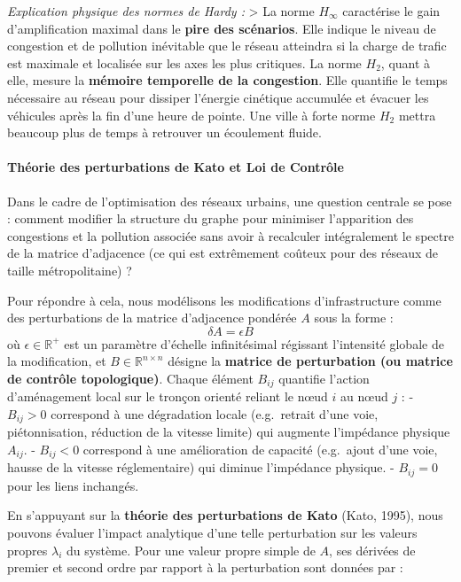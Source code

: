 \documentclass[10pt, a4paper]{article}
\begin{document}
\emph{Explication physique des normes de Hardy :} \textgreater{} La
norme \(H_\infty\) caractérise le gain d'amplification maximal dans le
\textbf{pire des scénarios}. Elle indique le niveau de congestion et de
pollution inévitable que le réseau atteindra si la charge de trafic est
maximale et localisée sur les axes les plus critiques. La norme \(H_2\),
quant à elle, mesure la \textbf{mémoire temporelle de la congestion}.
Elle quantifie le temps nécessaire au réseau pour dissiper l'énergie
cinétique accumulée et évacuer les véhicules après la fin d'une heure de
pointe. Une ville à forte norme \(H_2\) mettra beaucoup plus de temps à
retrouver un écoulement fluide.

\paragraph{Théorie des perturbations de Kato et Loi de
Contrôle}\label{thuxe9orie-des-perturbations-de-kato-et-loi-de-contruxf4le}

Dans le cadre de l'optimisation des réseaux urbains, une question
centrale se pose : comment modifier la structure du graphe pour
minimiser l'apparition des congestions et la pollution associée sans
avoir à recalculer intégralement le spectre de la matrice d'adjacence
(ce qui est extrêmement coûteux pour des réseaux de taille
métropolitaine) ?

Pour répondre à cela, nous modélisons les modifications d'infrastructure
comme des perturbations de la matrice d'adjacence pondérée \(A\) sous la
forme : \[\delta A = \epsilon B\] où \(\epsilon \in \mathbb{R}^+\) est
un paramètre d'échelle infinitésimal régissant l'intensité globale de la
modification, et \(B \in \mathbb{R}^{n \times n}\) désigne la
\textbf{matrice de perturbation (ou matrice de contrôle topologique)}.
Chaque élément \(B_{ij}\) quantifie l'action d'aménagement local sur le
tronçon orienté reliant le nœud \(i\) au nœud \(j\) : - \(B_{ij} > 0\)
correspond à une dégradation locale (e.g.~retrait d'une voie,
piétonnisation, réduction de la vitesse limite) qui augmente l'impédance
physique \(A_{ij}\). - \(B_{ij} < 0\) correspond à une amélioration de
capacité (e.g.~ajout d'une voie, hausse de la vitesse réglementaire) qui
diminue l'impédance physique. - \(B_{ij} = 0\) pour les liens inchangés.

En s'appuyant sur la \textbf{théorie des perturbations de Kato} (Kato,
1995), nous pouvons évaluer l'impact analytique d'une telle perturbation
sur les valeurs propres \(\lambda_i\) du système. Pour une valeur propre
simple de \(A\), ses dérivées de premier et second ordre par rapport à
la perturbation sont données par :
\end{document}

